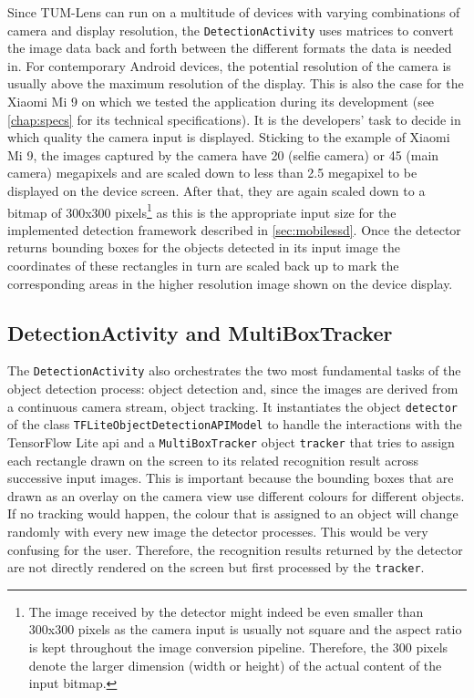 \documentclass[
			   fontsize=11pt,
               paper=a4,
               bibliography=totoc,
               idxtotoc,
               headsepline,
               footsepline,
               footinclude=false,
               BCOR=12mm,
               DIV=13,
               openany,   %
               ]
               {scrbook}
\newcommand{\code}[1]{\lstinline[basicstyle = \ttfamily\small]{#1}} %
\begin{document}
Since TUM-Lens can run on a multitude of devices with varying combinations of camera and display resolution, the \code{DetectionActivity} uses matrices to convert the image data back and forth between the different formats the data is needed in. For contemporary Android devices, the potential resolution of the camera is usually above the maximum resolution of the display. This is also the case for the Xiaomi Mi 9 on which we tested the application during its development (see \autoref{chap:specs} for its technical specifications). It is the developers' task to decide in which quality the camera input is displayed. Sticking to the example of Xiaomi Mi 9, the images captured by the camera have 20 (selfie camera) or 45 (main camera) megapixels and are scaled down to less than 2.5 megapixel to be displayed on the device screen. After that, they are again scaled down to a bitmap of 300x300 pixels\footnote{The image received by the detector might indeed be even smaller than 300x300 pixels as the camera input is usually not square and the aspect ratio is kept throughout the image conversion pipeline. Therefore, the 300 pixels denote the larger dimension (width or height) of the actual content of the input bitmap.} as this is the appropriate input size for the implemented detection framework described in \autoref{sec:mobilessd}. Once the detector returns bounding boxes for the objects detected in its input image the coordinates of these rectangles in turn are scaled back up to mark the corresponding areas in the higher resolution image shown on the device display.

\subsection{DetectionActivity and MultiBoxTracker} \label{ssec:detectionAndTracking}

The \code{DetectionActivity} also orchestrates the two most fundamental tasks of the object detection process: object detection and, since the images are derived from a continuous camera stream, object tracking. It instantiates the object \code{detector} of the class \code{TFLiteObjectDetectionAPIModel} to handle the interactions with the TensorFlow Lite \gls{api} and a \code{MultiBoxTracker} object \code{tracker} that tries to assign each rectangle drawn on the screen to its related recognition result across successive input images. This is important because the bounding boxes that are drawn as an overlay on the camera view use different colours for different objects. If no tracking would happen, the colour that is assigned to an object will change randomly with every new image the detector processes. This would be very confusing for the user. Therefore, the recognition results returned by the detector are not directly rendered on the screen but first processed by the \code{tracker}. \\
\end{document}
